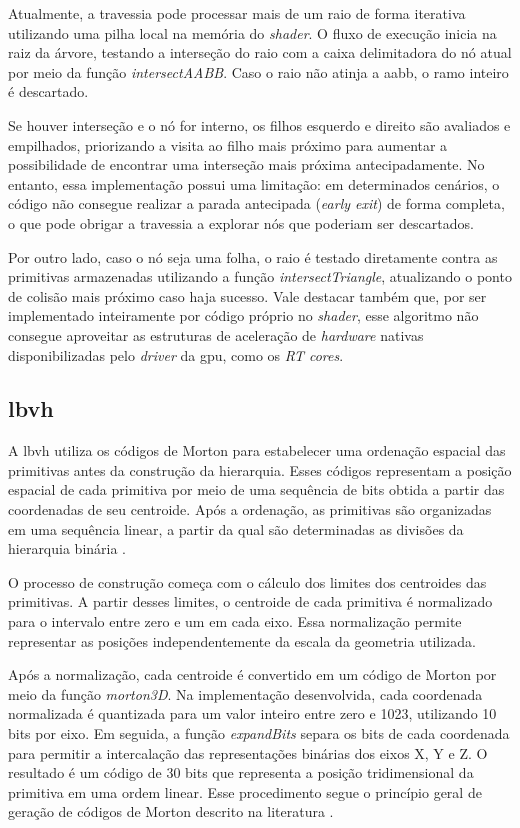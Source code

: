 Atualmente, a travessia pode processar mais de um raio de forma iterativa utilizando uma pilha local na memória do \textit{shader}. O fluxo de execução inicia na raiz da árvore, testando a interseção do raio com a caixa delimitadora do nó atual por meio da função \textit{intersectAABB}. Caso o raio não atinja a \gls{aabb}, o ramo inteiro é descartado.

Se houver interseção e o nó for interno, os filhos esquerdo e direito são avaliados e empilhados, priorizando a visita ao filho mais próximo para aumentar a possibilidade de encontrar uma interseção mais próxima antecipadamente. No entanto, essa implementação possui uma limitação: em determinados cenários, o código não consegue realizar a parada antecipada (\textit{early exit}) de forma completa, o que pode obrigar a travessia a explorar nós que poderiam ser descartados.

Por outro lado, caso o nó seja uma folha, o raio é testado diretamente contra as primitivas armazenadas utilizando a função \textit{intersectTriangle}, atualizando o ponto de colisão mais próximo caso haja sucesso. Vale destacar também que, por ser implementado inteiramente por código próprio no \textit{shader}, esse algoritmo não consegue aproveitar as estruturas de aceleração de \textit{hardware} nativas disponibilizadas pelo \textit{driver} da \gls{gpu}, como os \textit{RT cores}.

\subsection{\gls{lbvh}}

A \gls{lbvh} utiliza os códigos de Morton para estabelecer uma ordenação espacial das primitivas antes da construção da hierarquia. Esses códigos representam a posição espacial de cada primitiva por meio de uma sequência de bits obtida a partir das coordenadas de seu centroide. Após a ordenação, as primitivas são organizadas em uma sequência linear, a partir da qual são determinadas as divisões da hierarquia binária \cite{pantaleoni2010hlbvh}.

O processo de construção começa com o cálculo dos limites dos centroides das primitivas. A partir desses limites, o centroide de cada primitiva é normalizado para o intervalo entre zero e um em cada eixo. Essa normalização permite representar as posições independentemente da escala da geometria utilizada.

Após a normalização, cada centroide é convertido em um código de Morton por meio da função \textit{morton3D}. Na implementação desenvolvida, cada coordenada normalizada é quantizada para um valor inteiro entre zero e 1023, utilizando 10 bits por eixo. Em seguida, a função \textit{expandBits} separa os bits de cada coordenada para permitir a intercalação das representações binárias dos eixos X, Y e Z. O resultado é um código de 30 bits que representa a posição tridimensional da primitiva em uma ordem linear. Esse procedimento segue o princípio geral de geração de códigos de Morton descrito na literatura \cite{pantaleoni2010hlbvh}.

